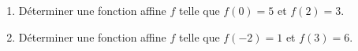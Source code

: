 
\begin{enumerate}
\item Déterminer une fonction affine $f$ telle que $f(0)=5$ et $f(2)=3$.
\item Déterminer une fonction affine $f$ telle que $f(-2)=1$ et $f(3)=6$.
\end{enumerate}
